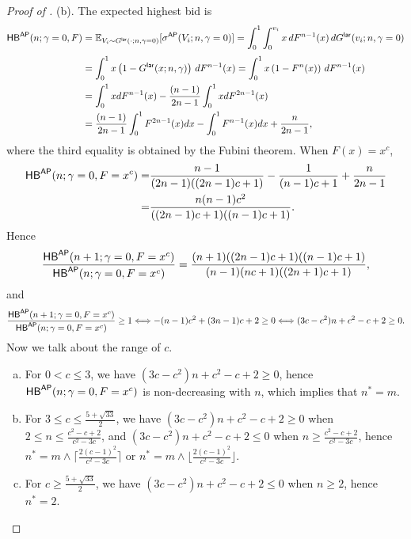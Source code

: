 \begin{proof}[{Proof of }]
\noindent (b). The expected highest bid is
\begin{align*}
 \mathsf{HB}^{\mathsf{AP}}(n;\gamma=0,F) & = \mathbb{E}_{V_i\sim G^{\mathsf{lar}}(\cdot; n,\gamma=0)}[\sigma^{\mathsf{AP}}(V_i;n,\gamma=0)]
 = \int_0^1 \int_0^{v_i} x\, dF^{n-1}(x)\, dG^{\mathsf{lar}}(v_i;n,\gamma = 0)\\[1mm]
 &= \int_0^1 x \left(1-G^{\mathsf{lar}}(x; n,\gamma)\right)\, dF^{n-1}(x) = \int_0^1 x \left(1-F^n(x)\right)\, dF^{n-1}(x)\\
 & = \int_0^1 xdF^{n-1}(x) - \frac{(n-1)}{2n-1} \int_0^1 xdF^{2n-1}(x)\\
 & = \frac{(n-1)}{2n-1}\int_0^1 F^{2n-1}(x)dx - \int_0^1 F^{n-1}(x)dx + \frac{n}{2n-1},
\end{align*}
where the third equality is obtained by the Fubini theorem. When $F(x) = x^c$, 
\begin{align*}
    \mathsf{HB}^{\mathsf{AP}}(n;\gamma=0, F=x^c) = &\frac{n-1}{(2n-1)((2n-1)c+1)} - \frac{1}{(n-1)c+1} + \frac{n}{2n-1} \\
    =& \frac{n(n-1)c^2}{((2n-1)c+1)((n-1)c+1)}.
\end{align*}
Hence 
\begin{align*}
    \frac{ \mathsf{HB}^{\mathsf{AP}}(n+1;\gamma=0, F=x^c)}{ \mathsf{HB}^{\mathsf{AP}}(n;\gamma=0, F=x^c)} = \frac{(n+1)((2n-1)c+1)((n-1)c+1)}{(n-1)(nc+1)((2n+1)c+1)},
\end{align*}
and 
\begin{align*}
 \frac{ \mathsf{HB}^{\mathsf{AP}}(n+1;\gamma=0, F=x^c)}{ \mathsf{HB}^{\mathsf{AP}}(n;\gamma=0, F=x^c)} \geq 1 \Longleftrightarrow -(n-1)c^2 + (3n-1)c + 2 \geq 0 \Longleftrightarrow (3c - c^2)n + c^2-c+2\geq 0.
\end{align*}
Now we talk about the range of $c$.
\begin{enumerate}[(a)]
    \item For $0<c\leq 3$, we have $(3c - c^2)n + c^2-c+2\geq 0 $, hence $\mathsf{HB}^{\mathsf{AP}}(n;\gamma=0, F=x^c)$ is non-decreasing with $n$, which implies that $n^* = m$.
    \item For $3 \leq c \leq \frac{5+\sqrt{33}}{2}$, we have $(3c - c^2)n + c^2-c+2\geq 0$ when $2 \leq n \leq \frac{c^2-c+2}{c^2-3c}$, and $(3c - c^2)n + c^2-c+2\leq 0$ when $ n \geq \frac{c^2-c+2}{c^2-3c}$, hence $n^* = m \wedge \bigg\lceil{\frac{2(c-1)^2}{c^2-3c}}\bigg\rceil$ or $n^* = m \wedge \bigg\lfloor{\frac{2(c-1)^2}{c^2-3c}}\bigg\rfloor$.
    \item For $c \geq \frac{5+\sqrt{33}}{2}$, we have $(3c - c^2)n + c^2-c+2\leq 0$ when $n\geq 2$, hence $n^*=2$.
\end{enumerate}




\end{proof}
